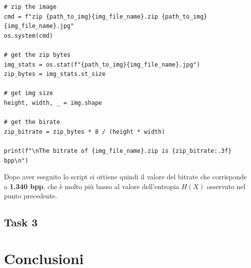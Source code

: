 \begin{lstlisting}
# zip the image
cmd = f"zip {path_to_img}{img_file_name}.zip {path_to_img}{img_file_name}.jpg"
os.system(cmd)

# get the zip bytes
img_stats = os.stat(f"{path_to_img}{img_file_name}.jpg")
zip_bytes = img_stats.st_size

# get img size
height, width, _ = img.shape

# get the birate
zip_bitrate = zip_bytes * 8 / (height * width) 

print(f"\nThe bitrate of {img_file_name}.zip is {zip_bitrate:.3f} bpp\n")
\end{lstlisting}

\noindent Dopo aver eseguito lo script si ottiene quindi il valore del bitrate che corrisponde a \textbf{1.340 bpp}, che è molto più basso al valore dell'entropia $H(X)$ osservato nel punto precedente.





\subsection*{Task 3}



\section{Conclusioni}



